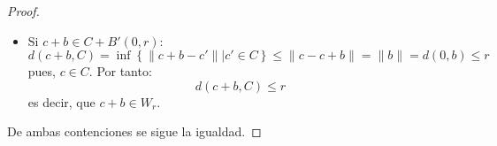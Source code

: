 \documentclass[12pt]{report}
\newcounter{it}
\theoremstyle{largebreak}
\begin{document}
\begin{proof}
\begin{itemize}
            \item Si $c+b\in C+B'(0,r)$:
            \begin{equation*}
                d(c+b,C)=\inf\left\{\|c+b-c' \|\Big|c'\in C \right\}\leq \|c-c+b \|=\|b\|=d(0,b)\leq r
            \end{equation*}
            pues, $c\in C$. Por tanto:
            \begin{equation*}
                d(c+b,C)\leq r
            \end{equation*}
            es decir, que $c+b\in W_r$.
        \end{itemize}
        De ambas contenciones se sigue la igualdad.
    \end{proof}
\end{document}
